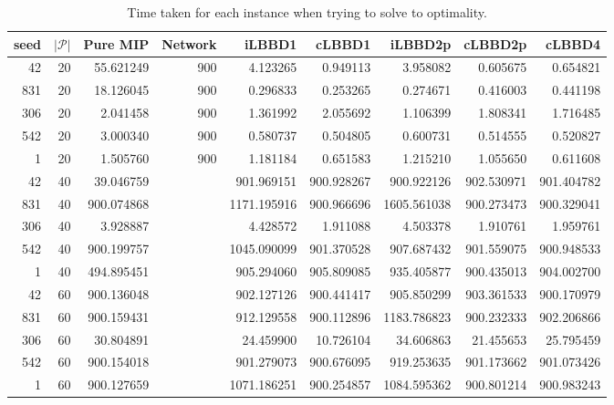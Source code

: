 \begin{table*}
    \centering
    \caption{Time taken for each instance when trying to solve to optimality.}
    \begin{tabular}{rrrrrrrrr} \toprule
        seed & $|\mathcal{P}|$ & Pure MIP & Network & iLBBD1 & cLBBD1 & iLBBD2p & cLBBD2p & cLBBD4 \\\midrule
        42     &       20    & 55.621249 &  900     & 4.123265 &  0.949113 & 3.958082 & 0.605675 & 0.654821 \\
       831     &       20    &18.126045 &   900     & 0.296833 &  0.253265 & 0.274671 & 0.416003 & 0.441198 \\
      306       &     20     &2.041458  &   900     & 1.361992 & 2.055692 & 1.106399 & 1.808341 & 1.716485 \\
      542       &     20     &3.000340  &  900     &  0.580737 & 0.504805 & 0.600731 & 0.514555 & 0.520827 \\
        1      &      20     &1.505760  &  900     & 1.181184 & 0.651583 & 1.215210 & 1.055650 & 0.611608 \\\midrule
       42      &      40    &   39.046759 &   &  901.969151 & 900.928267  & 900.922126 &  902.530971 & 901.404782 \\
     831       &     40    & 900.074868 &     &  1171.195916 & 900.966696 & 1605.561038 &  900.273473 & 900.329041 \\
     306       &     40    &  3.928887 &      &     4.428572  &  1.911088  &   4.503378  &  1.910761  &  1.959761 \\
    542       &     40   & 900.199757 &      &  1045.090099  & 901.370528  & 907.687432 &  901.559075 & 900.948533 \\
     1        &    40  &  494.895451  &      &  905.294060 &  905.809085  &  935.405877 & 900.435013 & 904.002700 \\\midrule
     42       &     60 &  900.136048  &       & 902.127126 &  900.441417  & 905.850299 &  903.361533 &  900.170979 \\
     831      &      60 &  900.159431  &      & 912.129558 & 900.112896 & 1183.786823 &  900.232333 &  902.206866 \\
     306      &      60  &  30.804891 &      &  24.459900  & 10.726104  &  34.606863 &  21.455653 &  25.795459 \\
     542      &      60 & 900.154018 &      &  901.279073 & 900.676095 &  919.253635 & 901.173662 & 901.073426 \\
     1        &    60  & 900.127659 &       & 1071.186251 & 900.254857 & 1084.595362 &  900.801214 & 900.983243 \\
     
     \bottomrule
    \end{tabular}
\end{table*}
